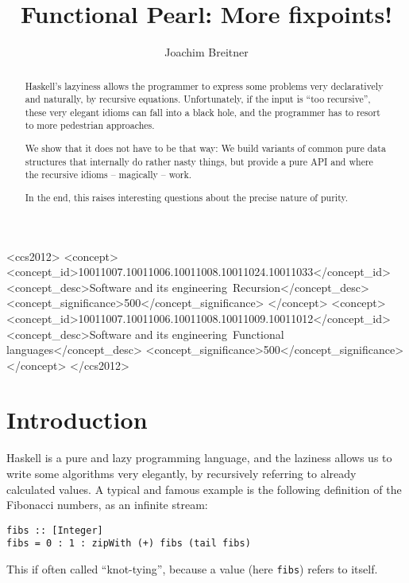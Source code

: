 \documentclass[manuscript,screen,acmsmall]{acmart}
\begin{document}
\title{Functional Pearl: More fixpoints!}

\author{Joachim Breitner}


\begin{abstract}
Haskell’s lazyiness allows the programmer to express some problems very declaratively and naturally, by recursive equations. Unfortunately, if the input is “too recursive”, these very elegant idioms can fall into a black hole, and the programmer has to resort to more pedestrian approaches.

We show that it does not have to be that way: We build variants of common pure data structures that internally do rather nasty things, but provide a pure API and where the recursive idioms -- magically -- work.

In the end, this raises interesting questions about the precise nature of purity.
\end{abstract}

\begin{CCSXML}
<ccs2012>
   <concept>
       <concept_id>10011007.10011006.10011008.10011024.10011033</concept_id>
       <concept_desc>Software and its engineering~Recursion</concept_desc>
       <concept_significance>500</concept_significance>
       </concept>
   <concept>
       <concept_id>10011007.10011006.10011008.10011009.10011012</concept_id>
       <concept_desc>Software and its engineering~Functional languages</concept_desc>
       <concept_significance>500</concept_significance>
       </concept>
 </ccs2012>
\end{CCSXML}



\maketitle

\section{Introduction}

Haskell is a pure and lazy programming language, and the laziness allows us to write some algorithms very elegantly, by recursively referring to already calculated values. A typical and famous example is the following definition of the Fibonacci numbers, as an infinite stream:
\begin{verbatim}
fibs :: [Integer]
fibs = 0 : 1 : zipWith (+) fibs (tail fibs)
\end{verbatim}
This if often called “knot-tying”, because a value (here \verb|fibs|) refers to itself.
\end{document}
